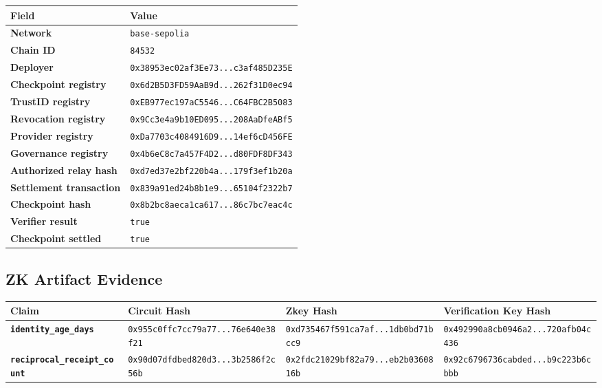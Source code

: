 \documentclass[11pt]{article}
\begin{document}
\begin{center}
\begin{tabularx}{\textwidth}{>{\bfseries}p{} X}
\toprule
Field & Value \\
\midrule
Network & \scriptsize\texttt{base-sepolia} \\
Chain ID & \scriptsize\texttt{84532} \\
Deployer & \scriptsize\texttt{0x38953ec02af3Ee73...c3af485D235E} \\
Checkpoint registry & \scriptsize\texttt{0x6d2B5D3FD59AaB9d...262f31D0ec94} \\
TrustID registry & \scriptsize\texttt{0xEB977ec197aC5546...C64FBC2B5083} \\
Revocation registry & \scriptsize\texttt{0x9Cc3e4a9b10ED095...208AaDfeABf5} \\
Provider registry & \scriptsize\texttt{0xDa7703c4084916D9...14ef6cD456FE} \\
Governance registry & \scriptsize\texttt{0x4b6eC8c7a457F4D2...d80FDF8DF343} \\
Authorized relay hash & \scriptsize\texttt{0xd7ed37e2bf220b4a...179f3ef1b20a} \\
Settlement transaction & \scriptsize\texttt{0x839a91ed24b8b1e9...65104f2322b7} \\
Checkpoint hash & \scriptsize\texttt{0x8b2bc8aeca1ca617...86c7bc7eac4c} \\
Verifier result & \scriptsize\texttt{true} \\
Checkpoint settled & \scriptsize\texttt{true} \\
\bottomrule
\end{tabularx}
\end{center}

\subsection{ZK Artifact Evidence}

\begin{center}
\begin{tabularx}{\textwidth}{>{\bfseries}p{} X X X}
\toprule
Claim & Circuit Hash & Zkey Hash & Verification Key Hash \\
\midrule
\scriptsize\texttt{identity\_age\_days} & \scriptsize\texttt{0x955c0ffc7cc79a77...76e640e38f21} & \scriptsize\texttt{0xd735467f591ca7af...1db0bd71bcc9} & \scriptsize\texttt{0x492990a8cb0946a2...720afb04c436} \\
\scriptsize\texttt{reciprocal\_receipt\_count} & \scriptsize\texttt{0x90d07dfdbed820d3...3b2586f2c56b} & \scriptsize\texttt{0x2fdc21029bf82a79...eb2b0360816b} & \scriptsize\texttt{0x92c6796736cabded...b9c223b6cbbb} \\
\bottomrule
\end{tabularx}
\end{center}
\end{document}
